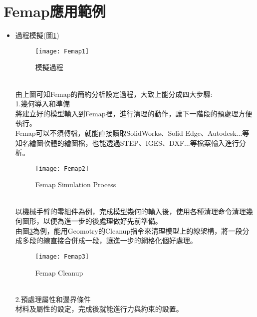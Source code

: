 \section{Femap應用範例}
\begin{itemize}
\item 過程模擬(圖\ref{3.02})\\
\begin{figure}[hbt!]
\begin{center}
\texttt{[image: Femap1]}
\caption{\Large 模擬過程}\label{3.02}
\end{center}
\end{figure}
\\
\qquad 由上圖可知Femap的簡約分析設定過程，大致上能分成四大步驟:\\

1.幾何導入和準備\\
\qquad 將建立好的模型輸入到Femap裡，進行清理的動作，讓下一階段的預處理方便執行。\\
\qquad Femap可以不須轉檔，就能直接讀取SolidWorks、Solid Edge、Autodesk...等知名繪圖軟體的繪圖檔，也能透過STEP、IGES、DXF...等檔案輸入進行分析。\\
\begin{figure}[hbt!]
\begin{center}
\texttt{[image: Femap2]}
\caption{\Large Femap Simulation Process}\label{3.03}
\end{center}
\end{figure}
\\
\qquad 以機械手臂的零組件為例，完成模型幾何的輸入後，使用各種清理命令清理幾何圖形，以便為進一步的後處理做好先前準備。\\

\qquad 由圖\ref{3.01}為例，能用Geomotry的Cleanup指令來清理模型上的線架構，將一段分成多段的線直接合併成一段，讓進一步的網格化個好處理。\\
\begin{figure}[hbt!]
\begin{center}
\texttt{[image: Femap3]}
\caption{\Large Femap Cleanup}\label{3.01}
\end{center}
\end{figure}
\\
2.預處理屬性和邊界條件\\
\qquad 材料及屬性的設定，完成後就能進行力與約束的設置。\\


\end{itemize}
